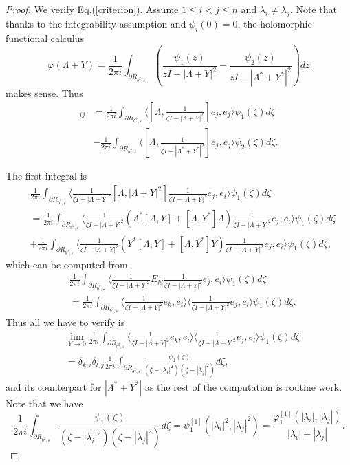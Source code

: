 \documentclass[12pt]{article}
\theoremstyle{definition}
\numberwithin{equation}{section}
\newcommand{\inpr}[2]{\langle{#1,#2}\rangle}
\begin{document}
\begin{proof} We verify Eq.(\ref{criterion}). 
Assume $1\leq i<j\leq n$ and $\lambda_i\neq \lambda_j$. 
Note that thanks to the integrability assumption and $\psi_i(0)=0$, the holomorphic functional calculus 
	\[\varphi(\Lambda+Y)=\frac{1}{2\pi i}\int_{\partial R_{b^2,\varepsilon}}
	\left(\frac{\psi_1(z)}{zI-|\Lambda+Y|^2}-\frac{\psi_2(z)}{zI-|\Lambda^*+Y^*|^2}\right)
	dz\]
makes sense. 
Thus 
\begin{align*}[\Lambda,P(Y)]_{ij}
	& =\frac{1}{2\pi i}\int_{\partial R_{b^2,\varepsilon}} \inpr{[\Lambda,\frac{1}{\zeta I-|\Lambda+Y|^2}]e_j}{e_j}\psi_1(\zeta)d\zeta \\
	&-\frac{1}{2\pi i}\int_{\partial R_{b^2,\varepsilon}} \inpr{[\Lambda,\frac{1}{\zeta I-|\Lambda^*+Y^*|^2}]e_j}{e_j}\psi_2(\zeta)d\zeta.
\end{align*}

The first integral is 
\begin{align*}
	&\frac{1}{2\pi i}\int_{\partial R_{b^2,\varepsilon}} \inpr{
		\frac{1}{\zeta I-|\Lambda+Y|^2}
		[\Lambda,|\Lambda+Y|^2] 
		\frac{1}{\zeta I-|\Lambda+Y|^2} e_j}{e_i}
	\psi_1(\zeta)d\zeta \\
	&=\frac{1}{2\pi i}\int_{\partial R_{b^2,\varepsilon}} \inpr{
		\frac{1}{\zeta I-|\Lambda+Y|^2}
		(\Lambda^*[\Lambda,Y]+[\Lambda,Y^*]\Lambda) 
		\frac{1}{\zeta I-|\Lambda+Y|^2} e_j}{e_i}
	\psi_1(\zeta)d\zeta \\
	&+\frac{1}{2\pi i}\int_{\partial R_{b^2,\varepsilon}} \inpr{
		\frac{1}{\zeta I-|\Lambda+Y|^2}
		(Y^*[\Lambda,Y]+[\Lambda,Y^*]Y) 
		\frac{1}{\zeta I-|\Lambda+Y|^2} e_j}{e_i}
	\psi_1(\zeta)d\zeta, 
\end{align*}
which can be computed from 
\begin{align*}
	&\frac{1}{2\pi i}\int_{\partial R_{b^2,\varepsilon}} \inpr{
		\frac{1}{\zeta I-|\Lambda+Y|^2}
		E_{kl} 
		\frac{1}{\zeta I-|\Lambda+Y|^2} e_j}{e_i}	\psi_1(\zeta)d\zeta\\ \nonumber
	&=\frac{1}{2\pi i}\int_{\partial R_{b^2,\varepsilon}} \inpr{\frac{1}{\zeta I-|\Lambda+Y|^2} e_k}{e_i}\inpr{\frac{1}{\zeta I-|\Lambda+Y|^2} e_j}{e_l}	\psi_1(\zeta)d\zeta. \nonumber
\end{align*}
Thus all we have to verify is  
\begin{align}\label{limit} 
	&\lim_{Y\to 0}
	\frac{1}{2\pi i}\int_{\partial R_{b^2,\varepsilon}} \inpr{\frac{1}{\zeta I-|\Lambda+Y|^2} e_k}{e_i}\inpr{\frac{1}{\zeta I-|\Lambda+Y|^2} e_j}{e_l}	\psi_1(\zeta)d\zeta\\ \nonumber
	&=\delta_{k,i}\delta_{l,j}\frac{1}{2\pi i}\int_{\partial R_{b^2,\varepsilon}}\frac{\psi_1(\zeta)}{(\zeta-|\lambda_i|^2)(\zeta-|\lambda_j|^2)}d\zeta,
\end{align}
and its counterpart for $|\Lambda^*+Y^*|$ as the rest of the computation is routine work. 
Note that we have 
\[\frac{1}{2\pi i}\int_{\partial R_{b^2,\varepsilon}}\frac{\psi_1(\zeta)}{(\zeta-|\lambda_i|^2)(\zeta-|\lambda_j|^2)}d\zeta
=\psi^{[1]}_1(|\lambda_i|^2,|\lambda_j|^2)
=\frac{\varphi_1^{[1]}(|\lambda_i|,|\lambda_j|)}{|\lambda_i|+|\lambda_j|}.\]





\end{proof}
\end{document}
